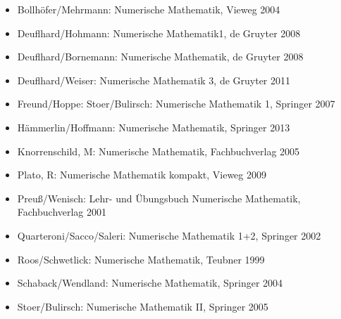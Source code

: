 \begin{itemize}
	\item Bollhöfer/Mehrmann: Numerische Mathematik, Vieweg 2004
	\item Deuflhard/Hohmann: Numerische Mathematik1, de Gruyter 2008
	\item Deuflhard/Bornemann: Numerische Mathematik, de Gruyter 2008
	\item Deuflhard/Weiser: Numerische Mathematik 3, de Gruyter 2011
	\item Freund/Hoppe: Stoer/Bulirsch: Numerische Mathematik 1, Springer 2007
	\item Hämmerlin/Hoffmann: Numerische Mathematik, Springer 2013
	\item Knorrenschild, M: Numerische Mathematik, Fachbuchverlag 2005
	\item Plato, R: Numerische Mathematik kompakt, Vieweg 2009
	\item Preuß/Wenisch: Lehr- und Übungsbuch Numerische Mathematik, Fachbuchverlag 2001
	\item Quarteroni/Sacco/Saleri: Numerische Mathematik 1+2, Springer 2002
	\item Roos/Schwetlick: Numerische Mathematik, Teubner 1999
	\item Schaback/Wendland: Numerische Mathematik, Springer 2004
	\item Stoer/Bulirsch: Numerische Mathematik II, Springer 2005
\end{itemize}